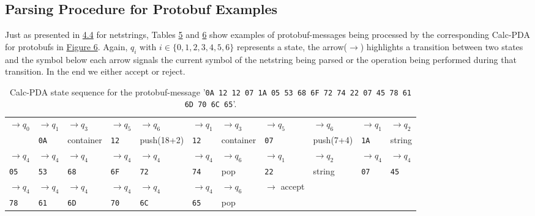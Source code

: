 \subsection{Parsing Procedure for Protobuf Examples}
\label{4.7}
Just as presented in \hyperref[4.4]{4.4} for netstrings, Tables \hyperref[tab:tab5-protobuf-1-Calc-pda-state-sequence]{5} and \hyperref[tab:tab6-protobuf-2-Calc-pda-state-sequence]{6} show examples of protobuf-messages being processed by the corresponding Calc-PDA for protobufs in \hyperref[fig:fig-6-protobuf-Calc-pda-1]{Figure 6}. Again, $q_i$ with $i\in\{0,1,2,3,4,5,6\}$ represents a state, the arrow($\rightarrow$) highlights a transition between two states and the symbol below each arrow signals the current symbol of the netstring being parsed or the operation being performed during that transition. In the end we either accept or reject.\\
\begin{table}
    \centering
    \begin{tabular}{|lllllllllll|}\hline
         $\rightarrow q_0$ &$\rightarrow q_1$ & $\rightarrow q_3$ & $\rightarrow q_5$ & $\rightarrow q_6$ & $\rightarrow q_1$ & $\rightarrow q_3$ & $\rightarrow q_5$ & $\rightarrow q_6$ & $\rightarrow q_1$ & $\rightarrow q_2$\\
        & \texttt{0A} &\tiny{container} &\texttt{12} & \tiny{push(18+2)} & \texttt{12} & \tiny{container} & \texttt{07} & \tiny{push(7+4)} & \texttt{1A} & \tiny{string} \\[10pt]\hline
        $\rightarrow q_4$ &$\rightarrow q_4$ & $\rightarrow q_4$ & $\rightarrow q_4$ & $\rightarrow q_4$ & $\rightarrow q_4$ & $\rightarrow q_6$ & $\rightarrow q_1$ & $\rightarrow q_2$ & $\rightarrow q_4$ & $\rightarrow q_4$\\
        \texttt{05} &\texttt{53} &\texttt{68} & \texttt{6F} & \texttt{72} & \texttt{74} & \tiny{pop} & \texttt{22} & \tiny{string} & \texttt{07}& \texttt{45} \\[10pt]\hline
        $\rightarrow q_4$ &$\rightarrow q_4$ & $\rightarrow q_4$ & $\rightarrow q_4$ & $\rightarrow q_4$ & $\rightarrow q_4$ & $\rightarrow q_6$ & $\rightarrow$ \tiny{accept} & & & \\
        \texttt{78} &\texttt{61} &\texttt{6D} & \texttt{70} & \texttt{6C} & \texttt{65} & \tiny{pop} &  &  & & \\[10pt]\hline
    \end{tabular}
    \caption{Calc-PDA state sequence for the protobuf-message '\texttt{0A 12 12 07 1A 05 53 68 6F 72 74 22 07 45 78 61 6D 70 6C 65}'.}
    \label{tab:tab5-protobuf-1-Calc-pda-state-sequence}
\end{table}
